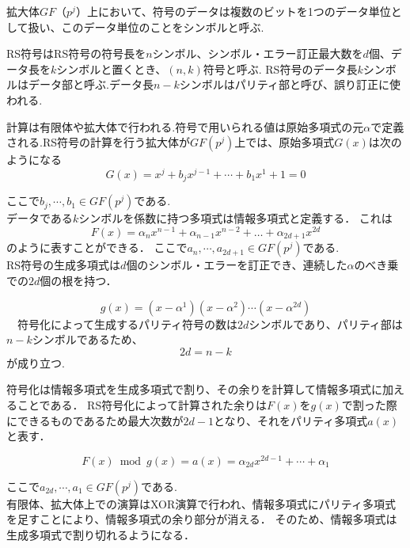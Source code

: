 \documentclass{thesis}
\begin{document}
拡大体$GF（p^j）$上において、符号のデータは複数のビットを1つのデータ単位として扱い、このデータ単位のことをシンボルと呼ぶ.

RS符号はRS符号の符号長を$n$シンボル、シンボル・エラー訂正最大数を$d$個、データ長を$k$シンボルと置くとき、$(n,k)$符号と呼ぶ.
RS符号のデータ長$k$シンボルはデータ部と呼ぶ.データ長$n-k$シンボルはパリティ部と呼び、誤り訂正に使われる.

計算は有限体や拡大体で行われる.符号で用いられる値は原始多項式の元$\alpha$で定義される.RS符号の計算を行う拡大体が$GF(p^j)$上では、原始多項式$G(x)$は次のようになる
\begin{equation}
G(x)=x^{j} + b_jx^{j-1} + \cdots + b_1x^1  + 1= 0　
\label{eq:genshi}
\end{equation}

ここで$b_{j},\cdots,b_1\in GF(p^j)$である.\\

データである$k$シンボルを係数に持つ多項式は情報多項式と定義する．
これは
\begin{equation}
F(x)= \alpha_{n}x^{n-1}+\alpha_{n-1} x^{n-2}+…+\alpha_{2d + 1} x^{2d}
\label{eq:stainf}
\end{equation}
のように表すことができる．
ここで$a_{n},\cdots,a_{2d+1}\in GF(p^j)$である.\\
RS符号の生成多項式は$d$個のシンボル・エラーを訂正でき、連続した$\alpha$のべき乗での$2d$個の根を持つ．

\begin{equation}
g(x) = (x-\alpha^1)( x-\alpha^2)\cdots( x-\alpha^{2d})
\label{eq:stagen}
\end{equation}
　符号化によって生成するパリティ符号の数は$2d$シンボルであり、パリティ部は$n-k$シンボルであるため、
\begin{equation*}
2d=n-k
\end{equation*}
が成り立つ.


符号化は情報多項式を生成多項式で割り、その余りを計算して情報多項式に加えることである．
RS符号化によって計算された余りは$F(x)$を$g(x)$で割った際にできるものであるため最大次数が$2d - 1$となり、それをパリティ多項式$a(x)$と表す．

\begin{equation}
F(x) \bmod g(x) = a(x) = \alpha_{2d}x^{2d - 1}+\cdots + \alpha_1
\end{equation}

ここで$a_{2d},\cdots,a_{1}\in GF(p^j)$である.\\
有限体、拡大体上での演算はXOR演算で行われ、情報多項式にパリティ多項式を足すことにより、情報多項式の余り部分が消える．
そのため、情報多項式は生成多項式で割り切れるようになる．
\end{document}

